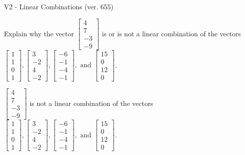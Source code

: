 \begin{exercise}
  \begin{exerciseTitle}V2 - Linear Combinations (ver. 655)\end{exerciseTitle}
  \begin{exerciseStatement}
    Explain why the vector \(\left[\begin{array}{c}
4 \\
7 \\
-3 \\
-9
\end{array}\right]\)  is or is not a linear 
	combination of the vectors \(\left[\begin{array}{c}
1 \\
1 \\
0 \\
1
\end{array}\right] , \left[\begin{array}{c}
3 \\
-2 \\
4 \\
-2
\end{array}\right] , \left[\begin{array}{c}
-6 \\
-1 \\
-4 \\
-1
\end{array}\right] , \text{ and } \left[\begin{array}{c}
15 \\
0 \\
12 \\
0
\end{array}\right]\).
	


  \end{exerciseStatement}
  \begin{exerciseAnswer}
   \(\left[\begin{array}{c}
4 \\
7 \\
-3 \\
-9
\end{array}\right]\) 
  	 is not  
	a linear combination of the vectors \(\left[\begin{array}{c}
1 \\
1 \\
0 \\
1
\end{array}\right] , \left[\begin{array}{c}
3 \\
-2 \\
4 \\
-2
\end{array}\right] , \left[\begin{array}{c}
-6 \\
-1 \\
-4 \\
-1
\end{array}\right] , \text{ and } \left[\begin{array}{c}
15 \\
0 \\
12 \\
0
\end{array}\right]\).


\end{exerciseAnswer}
\end{exercise}
